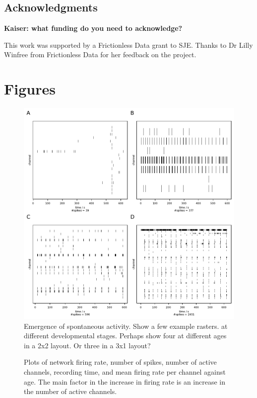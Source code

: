 \documentclass{bmcart}
\begin{document}
\begin{backmatter}

\subsection*{Acknowledgments}
\textbf{Kaiser: what funding do you need to acknowledge?}

This work was supported by a Frictionless Data grant to SJE\@.  Thanks
to Dr Lilly Winfree from Frictionless Data for her feedback on the
project.





\section*{Figures}
\begin{figure}[h!]
  \includegraphics{../plots/supplementary_figures/raster_plots.pdf}
  \caption{Emergence of spontaneous activity.  Show a few example rasters.
    at different developmental stages.  Perhaps show four at different
  ages in a 2x2 layout.  Or three in a 3x1 layout?}
  \label{fig:rasters}
\end{figure}

\begin{figure}[h!]
	\caption{Plots of network firing rate, number of spikes, number of active channels, recording time, and mean firing rate per channel against age. The main factor in the increase in firing rate is an increase in the number of active channels.}
	\label{fig:development}
\end{figure}


\end{backmatter}
\end{document}
